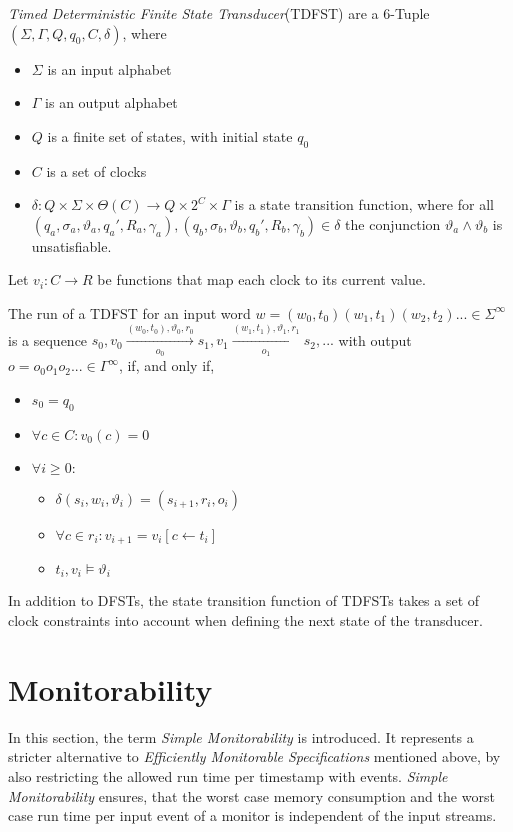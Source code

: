 		\begin{definition}
			\textit{Timed Deterministic Finite State Transducer}(TDFST) are a 6-Tuple $(\Sigma, \Gamma, Q, q_0, C, \delta)$, where
			\begin{itemize}
				\item
				$\Sigma$ is an input alphabet
				\item
				$\Gamma$ is an output alphabet
				\item
				$Q$ is a finite set of states, with initial state $q_0$
				\item
				$C$ is a set of clocks
				\item
				$\delta:Q\times\Sigma\times\Theta(C)\rightarrow Q\times 2^C\times\Gamma$ is a state transition function, where for all $(q_a, \sigma_a, \vartheta_a, q_a', R_a, \gamma_a), (q_b, \sigma_b, \vartheta_b, q_b', R_b, \gamma_b)\in \delta$ the conjunction $\vartheta_a\land\vartheta_b$ is unsatisfiable. 
			\end{itemize}
			Let $v_i:C\rightarrow R$ be functions that map each clock to its current value.
			
			The run of a TDFST for an input word $w=(w_0,t_0)(w_1,t_1)(w_2,t_2)...\in\Sigma^\infty$ is a sequence $s_0, v_0\xrightarrow[o_0]{(w_0, t_0),\vartheta_0,r_0}s_1,v_1\xrightarrow[o_1]{(w_1, t_1),\vartheta_1,r_1}s_2,...$ with output $o=o_0o_1o_2...\in \Gamma^\infty$, if, and only if, 
			\begin{itemize}
				\item
					$s_0=q_0$
				\item
					$\forall c\in C: v_0(c)=0$
				\item
					$\forall i\geq 0:$
					\begin{itemize}
						\item
							$\delta(s_i, w_i,\vartheta_i)=(s_{i+1},r_i,o_i)$
						\item
							$\forall c\in r_i: v_{i+1}=v_i[c\leftarrow t_i]$
						\item
							$t_i,v_i \models\vartheta_i$
					\end{itemize}
			\end{itemize}
		\end{definition}
		In addition to DFSTs, the state transition function of TDFSTs takes a set of clock constraints into account when defining the next state of the transducer.
	
\section{Monitorability}
	\label{sec:monitorability}
	In this section, the term \textit{Simple Monitorability} is introduced. It represents a stricter alternative to \textit{Efficiently Monitorable Specifications} mentioned above, by also restricting the allowed run time per timestamp with events. \textit{Simple Monitorability} ensures, that the worst case memory consumption and the worst case run time per input event of a monitor is independent of the input streams. 
